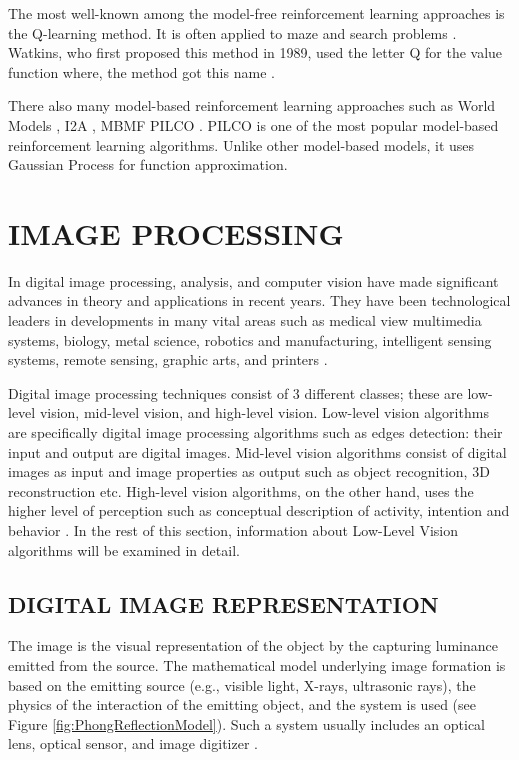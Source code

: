 The most well-known among the model-free reinforcement learning approaches is the Q-learning method. It is often applied to maze and search problems \cite{tijsma2016comparing, guo2004new, whitehead1991complexity}. Watkins, who first proposed this method in 1989, used the letter Q for the value function where, the method got this name \cite{watkins1989learning}.

There also many model-based reinforcement learning approaches such as World Models \cite{ha2018world}, I2A \cite{racaniere2017imagination}, MBMF \cite{bansal2017mbmf} PILCO \cite{deisenroth2011pilco}. PILCO is one of the most popular model-based reinforcement learning algorithms. Unlike other model-based models, it uses Gaussian Process for function approximation.

\section{IMAGE PROCESSING}

In digital image processing, analysis, and computer vision have made significant advances in theory and applications in recent years. They have been technological leaders in developments in many vital areas such as medical view multimedia systems, biology, metal science, robotics and manufacturing, intelligent sensing systems, remote sensing, graphic arts, and printers \cite{pitas2000digital}.


Digital image processing techniques consist of 3 different classes; these are low-level vision, mid-level vision, and high-level vision. Low-level vision algorithms are specifically digital image processing algorithms such as edges detection: their input and output are digital images. Mid-level vision algorithms consist of digital images as input and image properties as output such as object recognition, 3D reconstruction etc. High-level vision algorithms, on the other hand, uses the higher level of perception such as conceptual description of activity, intention and behavior \cite{pitas2000digital, gonzalez2002digital}. In the rest of this section, information about Low-Level Vision algorithms will be examined in detail.

\subsection{DIGITAL IMAGE REPRESENTATION}

The image is the visual representation of the object by the capturing luminance emitted from the source. The mathematical model underlying image formation is based on the emitting source (e.g., visible light, X-rays, ultrasonic rays), the physics of the interaction of the emitting object, and the system is used (see Figure \ref{fig:PhongReflectionModel}). Such a system usually includes an optical lens, optical sensor, and image digitizer \cite{pitas2000digital}.

